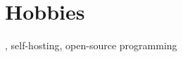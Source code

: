 %

\section*{Hobbies}
\iftoggle{onepage}{Weight lifting}{Working out at the gym}, self-hosting, open-source programming
